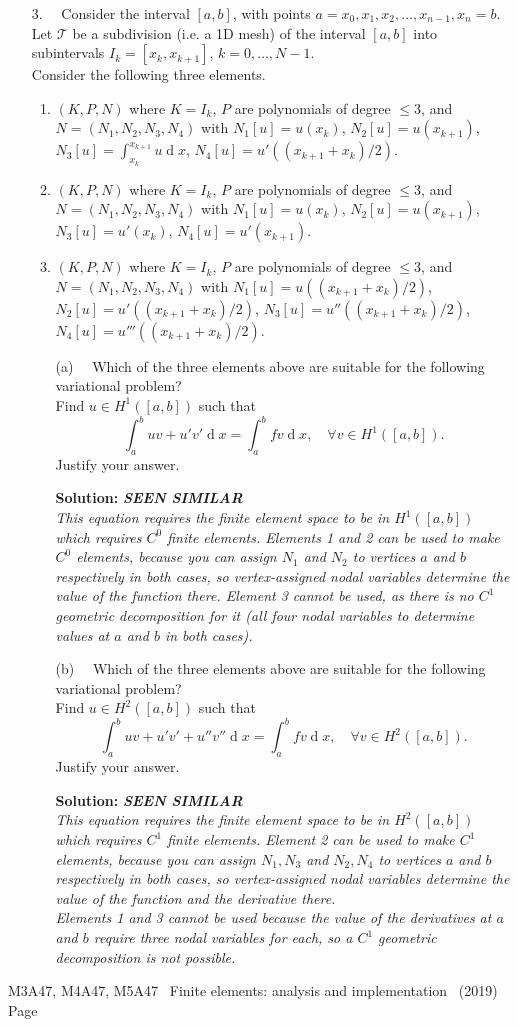 \documentclass[12pt]{article}
\newcommand{\coursenum}{M3A47, M4A47, M5A47} %
\newcommand{\coursename}{Finite elements: analysis and implementation} %
\newcommand{\similar}{{\bfseries SEEN SIMILAR\\}}
\newcommand{\exammarks}[1]{\begin{flushright}[#1 marks]\end{flushright}}%
\DeclareMathOperator{\diff}{d}
\newcommand{\soln}[1]{{\bfseries Solution:} {\itshape \color{blue} #1}}
\newcommand{\soln}[1]{}
\newcommand{\examyear}{2019}
\newenvironment{Question}[1] 
 {\begin{itemize} \item[\large #1.~~]}{\end{itemize} \medskip}
\newcommand{\EndPage}{
	\vfill \coursenum ~ \coursename ~
	(\examyear) \hfill Page \thepage \newpage
	}
\newcommand{\BeginParts}{\begin{itemize}}
\newcommand{\Part}[1]{\item [(#1)~~]}
\newcommand{\EndParts}{\end{itemize}}
\begin{document}
\begin{Question}{3}
  Consider the interval $[a,b]$, with points
  $a=x_0,x_1,x_2,\ldots,x_{n-1}, x_n=b$.  Let $\mathcal{T}$ be a
  subdivision (i.e. a 1D mesh) of the interval $[a,b]$ into
  subintervals $I_k=[x_k,x_{k+1}]$, $k=0,\ldots,N-1$.\\
  Consider the following three elements.
  \begin{enumerate}
  \item $(K,P,N)$ where $K=I_k$, $P$ are polynomials of degree $\leq
    3$, and $N=(N_1,N_2,N_3,N_4)$ with $N_1[u]=u(x_k)$, $N_2[u]=u(x_{k+1})$,
    $N_3[u]=\int_{x_k}^{x_{k+1}} u \diff x$,
    $N_4[u]=u'((x_{k+1}+x_k)/2)$.
  \item $(K,P,N)$ where $K=I_k$, $P$ are polynomials of degree $\leq
    3$, and $N=(N_1,N_2,N_3,N_4)$ with $N_1[u]=u(x_k)$, $N_2[u]=u(x_{k+1})$,
    $N_3[u]=u'(x_k)$, $N_4[u]=u'(x_{k+1})$.
  \item $(K,P,N)$ where $K=I_k$, $P$ are polynomials of degree $\leq
    3$, and $N=(N_1,N_2,N_3,N_4)$ with $N_1[u]=u((x_{k+1}+x_k)/2)$,
    $N_2[u]=u'((x_{k+1}+x_k)/2)$, $N_3[u]=u''((x_{k+1}+x_k)/2)$,
    $N_4[u]=u'''((x_{k+1}+x_k)/2)$.
  \end{enumerate}
  \BeginParts
  \Part{a} Which of the three elements above are suitable
  for the following variational problem?\\
  Find $u\in H^1([a,b])$ such that
  \[
    \int_a^b uv + u'v'\diff x = \int_a^b fv \diff x, \quad \forall v \in
    H^1([a,b]).
  \]
  Justify your answer.
  \exammarks{10}
  \soln{\similar
    This equation requires the finite element space to be in
    $H^1([a,b])$ which requires $C^0$ finite elements. Elements 1 and
    2 can be used to make $C^0$ elements, because you can assign
    $N_1$ and $N_2$ to vertices $a$ and $b$ respectively in both cases,
    so vertex-assigned nodal variables determine the value of the function
    there. Element 3 cannot be used, as there is no $C^1$ geometric
    decomposition for it (all four
    nodal variables to determine values at $a$ and $b$ in both cases).
  }
  \Part{b}  Which of the three elements above are suitable
  for the following variational problem?\\
  Find $u\in H^2([a,b])$ such that
  \[
    \int_a^b uv + u'v' + u''v''\diff x
    = \int_a^b fv \diff x, \quad \forall v \in
    H^2([a,b]).
  \]
  Justify your answer.  \exammarks{10} \soln{\similar This equation requires the finite
    element space to be in $H^2([a,b])$ which requires $C^1$ finite
    elements. Element 2 can be used to make $C^1$ elements, because
    you can assign $N_1, N_3$ and $N_2,N_4$ to vertices $a$ and $b$
    respectively in both cases, so vertex-assigned nodal variables
    determine the value of the function and the derivative
    there.\\ Elements 1 and 3 cannot be used because the value of the
    derivatives at $a$ and $b$ require three nodal variables for each, so
    a $C^1$ geometric decomposition is not possible.
  } \EndParts
\end{Question}
\EndPage
\end{document}
